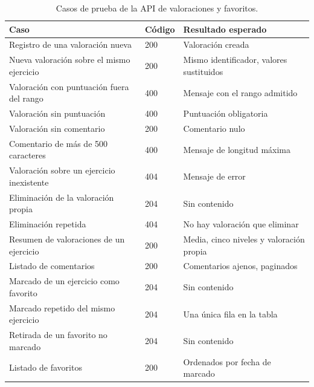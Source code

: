 \documentclass[12pt,a4paper,twoside,openright]{book}
\begin{document}
    \begin{table}[htbp]
        \centering
        \small
        \begin{tabular}{p{6.5cm} l p{4.5cm}}
            \toprule
            \textbf{Caso} & \textbf{Código} & \textbf{Resultado esperado} \\
            \midrule
            Registro de una valoración nueva              & 200 & Valoración creada \\
            Nueva valoración sobre el mismo ejercicio     & 200 & Mismo identificador, valores sustituidos \\
            Valoración con puntuación fuera del rango     & 400 & Mensaje con el rango admitido \\
            Valoración sin puntuación                     & 400 & Puntuación obligatoria \\
            Valoración sin comentario                     & 200 & Comentario nulo \\
            Comentario de más de 500 caracteres           & 400 & Mensaje de longitud máxima \\
            Valoración sobre un ejercicio inexistente     & 404 & Mensaje de error \\
            Eliminación de la valoración propia           & 204 & Sin contenido \\
            Eliminación repetida                          & 404 & No hay valoración que eliminar \\
            Resumen de valoraciones de un ejercicio       & 200 & Media, cinco niveles y valoración propia \\
            Listado de comentarios                        & 200 & Comentarios ajenos, paginados \\
            Marcado de un ejercicio como favorito         & 204 & Sin contenido \\
            Marcado repetido del mismo ejercicio          & 204 & Una única fila en la tabla \\
            Retirada de un favorito no marcado            & 204 & Sin contenido \\
            Listado de favoritos                          & 200 & Ordenados por fecha de marcado \\
            \bottomrule
        \end{tabular}
        \caption{Casos de prueba de la API de valoraciones y favoritos.}
        \label{tab:pruebas-social-api}
    \end{table}
\end{document}
